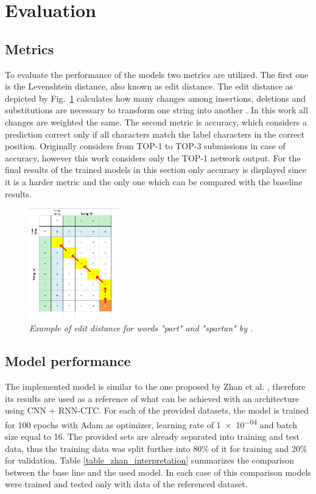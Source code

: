 \section{Evaluation}\label{sec:evaluation}

\subsection{Metrics}

To evaluate the performance of the models two metrics are utilized. The first one is the Levenshtein distance, also known as edit distance. The edit distance as depicted by Fig.~\ref{fig_edit_distance} calculates how many changes among insertions, deletions and substitutions are necessary to transform one string into another \cite{rice_edit_dist}. In this work all changes are weighted the same. The second metric is accuracy, which considers a prediction correct only if all characters match the label characters in the correct position. Originally \cite{icfhr_competition} considers from TOP-1 to TOP-3 submissions in case of accuracy, however this work considers only the TOP-1 network output. For the final results of the trained models in this section only accuracy is displayed since it is a harder metric and the only one which can be compared with the baseline results. 

\begin{figure}[t]
\centerline{\includegraphics[width=40mm]{images/edit_distance}}
\caption{{\it Example of edit distance for words "part" and "spartan" by \cite{rice_edit_dist}.}}  
\label{fig_edit_distance}
\end{figure}

\subsection{Model performance}

The implemented model is similar to the one proposed by Zhan et al. \cite{zhan2017}, therefore its results are used as a reference of what can be achieved with an architecture using CNN + RNN-CTC. For each of the provided datasets, the model is trained for 100 epochs with Adam as optimizer, learning rate of \num{1e-04} and batch size equal to 16. The provided sets are already separated into training and test data, thus the training data was split further into 80\% of it for training and 20\% for validation. Table \ref{table_zhan_interpretation} summarizes the comparison between the base line and the used model. In each case of this comparison models were trained and tested only with data of the referenced dataset. 

